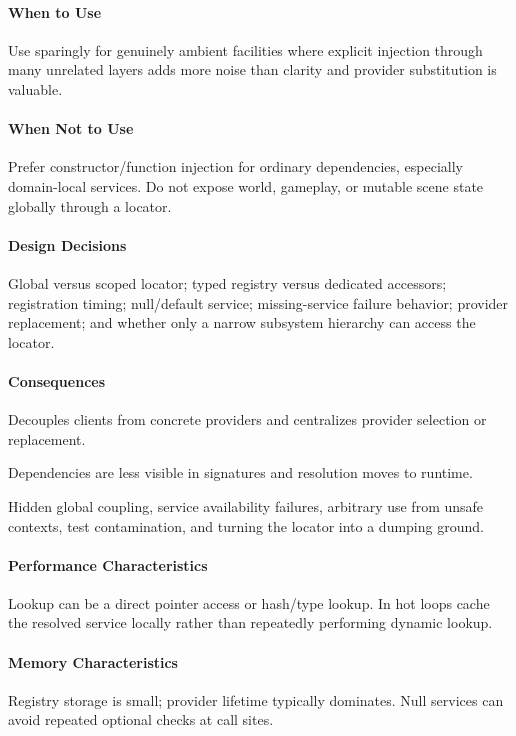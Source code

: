 \documentclass[11pt]{article}
\begin{document}
\paragraph{When to Use} Use sparingly for genuinely ambient facilities where explicit injection through many unrelated layers adds more noise than clarity and provider substitution is valuable.
\paragraph{When Not to Use} Prefer constructor/function injection for ordinary dependencies, especially domain-local services. Do not expose world, gameplay, or mutable scene state globally through a locator.
\paragraph{Design Decisions} Global versus scoped locator; typed registry versus dedicated accessors; registration timing; null/default service; missing-service failure behavior; provider replacement; and whether only a narrow subsystem hierarchy can access the locator.
\paragraph{Consequences}
\begin{description}[leftmargin=2.7cm,style=nextline]
\item[Benefits] Decouples clients from concrete providers and centralizes provider selection or replacement.
\item[Costs] Dependencies are less visible in signatures and resolution moves to runtime.
\item[Risks] Hidden global coupling, service availability failures, arbitrary use from unsafe contexts, test contamination, and turning the locator into a dumping ground.
\end{description}
\paragraph{Performance Characteristics} Lookup can be a direct pointer access or hash/type lookup. In hot loops cache the resolved service locally rather than repeatedly performing dynamic lookup.
\paragraph{Memory Characteristics} Registry storage is small; provider lifetime typically dominates. Null services can avoid repeated optional checks at call sites.
\end{document}
